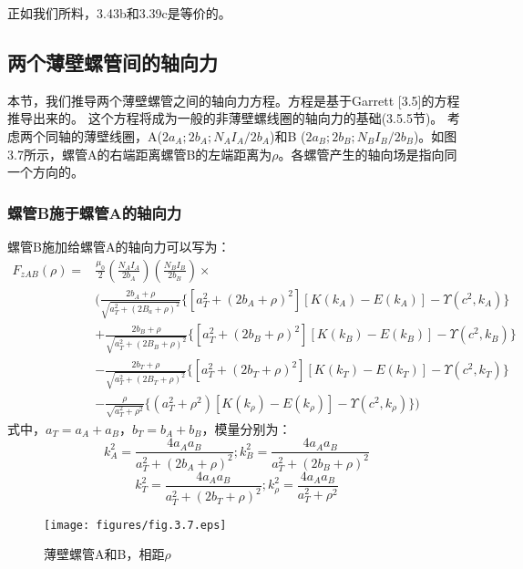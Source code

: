 正如我们所料，3.43b和3.39c是等价的。
\subsection{两个薄壁螺管间的轴向力}
本节，我们推导两个薄壁螺管之间的轴向力方程。方程是基于Garrett [3.5]的方程推导出来的。
这个方程将成为一般的非薄壁螺线圈的轴向力的基础(3.5.5节)。
考虑两个同轴的薄壁线圈，A($2a_A; 2b_A; N_A I_A/2b_A$)和B ($2a_B; 2b_B;
N_B I_B/2b_B$)。如图3.7所示，螺管A的右端距离螺管B的左端距离为$\rho$。各螺管产生的轴向场是指向同一个方向的。
\subsubsection{螺管B施于螺管A的轴向力}
螺管B施加给螺管A的轴向力可以写为：
\begin{equation}
\begin{split}
F_{zAB}(\rho)=&\frac{\mu_0}{2}(\frac{N_A I_A}{2b_A})(\frac{N_B I_B}{2b_B})\times \\
&(\frac{2b_A+\rho}{\sqrt{a_T^2+(2B_a+\rho)^2}} \{[a_T^2+(2b_A+\rho)^2][K(k_{A})-E(k_{A})]-\Upsilon(c^2,k_A)\}\\
&+\frac{2b_B+\rho}{\sqrt{a_T^2+(2B_B+\rho)^2}} \{[a_T^2+(2b_B+\rho)^2][K(k_{B})-E(k_{B})]-\Upsilon(c^2,k_B) \}\\
&-\frac{2b_T+\rho}{\sqrt{a_T^2+(2B_T+\rho)^2}} \{[a_T^2+(2b_T+\rho)^2][K(k_{T})-E(k_{T})]-\Upsilon(c^2,k_T) \}\\
&-\frac{\rho}{\sqrt{a_T^2+\rho^2}}\{(a_T^2+\rho^2)[K(k_\rho)-E(k_\rho)]-\Upsilon(c^2,k_\rho)\})
\end{split}
\end{equation}
式中，$a_T=a_A+a_B$，$b_T=b_A+b_B$，模量分别为：
$$k_{A}^2=\frac{4a_A a_B}{a_T^2+(2b_A+\rho)^2} ; k_{B}^2=\frac{4a_A a_B}{a_T^2+(2b_B+\rho)^2} $$
$$k_{T}^2=\frac{4a_A a_B}{a_T^2+(2b_T+\rho)^2} ; k_{\rho}^2=\frac{4a_A a_B}{a_T^2+\rho^2} $$

\begin{figure}[htbp]
  \centering
 \texttt{[image: figures/fig.3.7.eps]}
  \caption{薄壁螺管A和B，相距$\rho$}
\end{figure}

